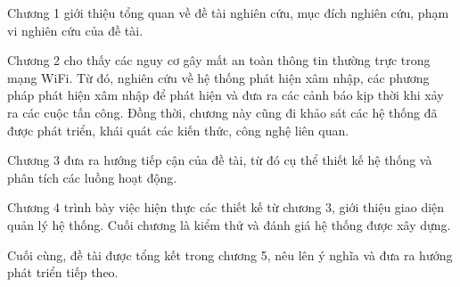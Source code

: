 Chương 1 giới thiệu tổng quan về đề tài nghiên cứu, mục đích nghiên cứu, phạm vi nghiên cứu của đề tài.

Chương 2 cho thấy các nguy cơ gây mất an toàn thông tin thường trực trong mạng WiFi. Từ đó, nghiên cứu về hệ thống phát hiện xâm nhập, các phương pháp phát hiện xâm nhập để phát hiện và đưa ra các cảnh báo kịp thời khi xảy ra các cuộc tấn công. Đồng thời, chương này cũng đi khảo sát các hệ thống đã được phát triển, khái quát các kiến thức, công nghệ liên quan.

Chương 3 đưa ra hướng tiếp cận của đề tài, từ đó cụ thể thiết kế hệ thống và phân tích các luồng hoạt động.

Chương 4 trình bày việc hiện thực các thiết kế từ chương 3, giới thiệu giao diện quản lý hệ thống. Cuối chương là kiểm thử và đánh giá hệ thống được xây dựng.

Cuối cùng, đề tài được tổng kết trong chương 5, nêu lên ý nghĩa và đưa ra hướng phát triển tiếp theo.

